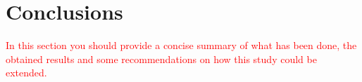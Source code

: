 \section{Conclusions}
\label{sec:conclusions}

\textcolor{red}{In this section you should provide a concise summary of what has been done, the obtained results and some recommendations on how this study could be extended.}

\lipsum[4]